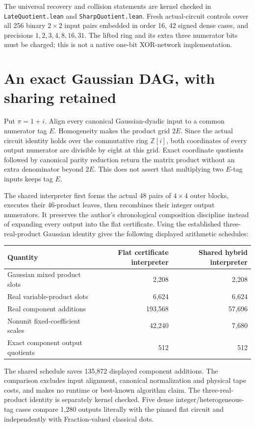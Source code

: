 \documentclass[11pt]{article}
\newcommand{\Gi}{\mathbb Z[i]}
\newcommand{\pii}{\pi}
\begin{document}
The universal recovery and collision statements are kernel checked in
\texttt{LateQuotient.lean} and \texttt{SharpQuotient.lean}. Fresh actual-circuit
controls cover all 256 binary $2\times2$ input pairs embedded in order 16,
42 signed dense cases, and precisions $1,2,3,4,8,16,31$. The lifted ring and
its extra three numerator bits must be charged; this is not a native
one-bit XOR-network implementation.

\section{An exact Gaussian DAG, with sharing retained}
Put $\pii=1+i$. Align every canonical Gaussian-dyadic input to a common
numerator tag $E$. Homogeneity makes the product grid $2E$. Since the
actual circuit identity holds over the commutative ring $\Gi$, both
coordinates of every output numerator are divisible by eight at this
grid. Exact coordinate quotients followed by canonical parity reduction
return the matrix product without an extra denominator beyond $2E$.
This does not assert that multiplying two $E$-tag inputs keeps tag $E$.

The shared interpreter first forms the actual 48 pairs of $4\times4$
outer blocks, executes their 46-product leaves, then recombines their
integer output numerators. It preserves the author's chronological
composition discipline instead of expanding every output into the flat
certificate. Using the established three-real-product Gaussian identity
gives the following displayed arithmetic schedules:
\begin{center}
\begin{tabular}{lrr}
\toprule
Quantity & Flat certificate interpreter & Shared hybrid interpreter\\
\midrule
Gaussian mixed product slots & 2,208 & 2,208\\
Real variable-product slots & 6,624 & 6,624\\
Real component additions & 193,568 & 57,696\\
Nonunit fixed-coefficient scales & 42,240 & 7,680\\
Exact component output quotients & 512 & 512\\
\bottomrule
\end{tabular}
\end{center}
The shared schedule saves 135,872 displayed component additions. The
comparison excludes input alignment, canonical normalization and physical
tape costs, and makes no runtime or best-known algorithm claim. The
three-real-product identity is separately kernel checked. Five dense
integer/heterogeneous-tag cases compare 1,280 outputs literally with the
pinned flat circuit and independently with Fraction-valued classical dots.
\end{document}
